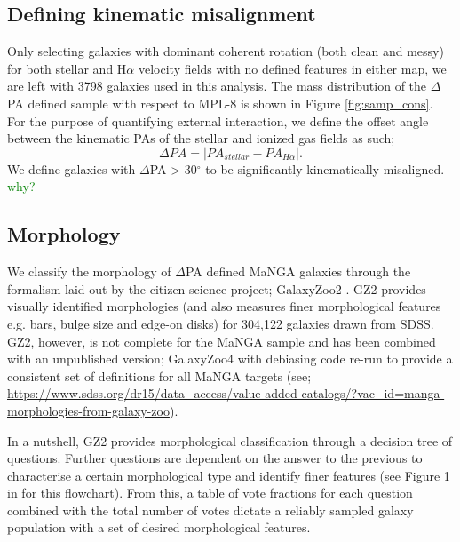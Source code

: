 \documentclass[fleqn,usenatbib]{mnras}
\newcommand{\green}[1]{{\textcolor{green}{#1}}}
\begin{document}
\subsection{Defining kinematic misalignment} \label{sec:def_kin_mis}
Only selecting galaxies with dominant coherent rotation (both clean and messy) for both stellar and H$\alpha$ velocity fields with no defined features in either map, we are left with 3798 galaxies used in this analysis. The mass distribution of the $\Delta$PA defined sample with respect to MPL-8 is shown in Figure \ref{fig:samp_cons}. For the purpose of quantifying external interaction, we define the offset angle between the kinematic PAs of the stellar and ionized gas fields as such; 
\begin{equation} \label{eq:delPA}
\Delta PA = |PA_{stellar} - PA_{H\alpha}|. 
\end{equation}
We define galaxies with $\Delta$PA > 30$^{\circ}$ to be significantly kinematically misaligned. \green{why?}

\subsection{Morphology} \label{sec:morph_def}
We classify the morphology of $\Delta$PA defined MaNGA galaxies through the formalism laid out by the citizen science project; GalaxyZoo2 \citep[GZ2;][]{willett2013}. GZ2 provides visually identified morphologies (and also measures finer morphological features e.g. bars, bulge size and edge-on disks) for 304,122 galaxies drawn from SDSS. GZ2, however, is not complete for the MaNGA sample and has been combined with an unpublished version; GalaxyZoo4 with debiasing code re-run to provide a consistent set of definitions for all MaNGA targets (see; \url{https://www.sdss.org/dr15/data_access/value-added-catalogs/?vac_id=manga-morphologies-from-galaxy-zoo}). 

In a nutshell, GZ2 provides morphological classification through a decision tree of questions. Further questions are dependent on the answer to the previous to characterise a certain morphological type and identify finer features (see Figure 1 in \citep{willett2013} for this flowchart). From this, a table of vote fractions for each question combined with the total number of votes dictate a reliably sampled galaxy population with a set of desired morphological features. 
\end{document}
